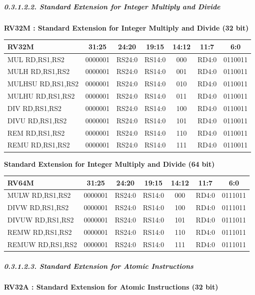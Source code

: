 \documentclass[
]{article}
\begin{document}
\hypertarget{standard-extension-for-integer-multiply-and-divide-1}{%
\subparagraph{0.3.1.2.2. Standard Extension for Integer Multiply and
Divide}\label{standard-extension-for-integer-multiply-and-divide-1}}

\textbf{RV32M : Standard Extension for Integer Multiply and Divide (32
bit)}

\begin{longtable}[]{@{}lcccccc@{}}
\toprule
RV32M & 31:25 & 24:20 & 19:15 & 14:12 & 11:7 & 6:0\tabularnewline
\midrule
\endhead
MUL RD,RS1,RS2 & 0000001 & RS24:0 & RS14:0 & 000 & RD4:0 &
0110011\tabularnewline
MULH RD,RS1,RS2 & 0000001 & RS24:0 & RS14:0 & 001 & RD4:0 &
0110011\tabularnewline
MULHSU RD,RS1,RS2 & 0000001 & RS24:0 & RS14:0 & 010 & RD4:0 &
0110011\tabularnewline
MULHU RD,RS1,RS2 & 0000001 & RS24:0 & RS14:0 & 011 & RD4:0 &
0110011\tabularnewline
DIV RD,RS1,RS2 & 0000001 & RS24:0 & RS14:0 & 100 & RD4:0 &
0110011\tabularnewline
DIVU RD,RS1,RS2 & 0000001 & RS24:0 & RS14:0 & 101 & RD4:0 &
0110011\tabularnewline
REM RD,RS1,RS2 & 0000001 & RS24:0 & RS14:0 & 110 & RD4:0 &
0110011\tabularnewline
REMU RD,RS1,RS2 & 0000001 & RS24:0 & RS14:0 & 111 & RD4:0 &
0110011\tabularnewline
\bottomrule
\end{longtable}

\textbf{Standard Extension for Integer Multiply and Divide (64 bit)}

\begin{longtable}[]{@{}lcccccc@{}}
\toprule
RV64M & 31:25 & 24:20 & 19:15 & 14:12 & 11:7 & 6:0\tabularnewline
\midrule
\endhead
MULW RD,RS1,RS2 & 0000001 & RS24:0 & RS14:0 & 000 & RD4:0 &
0111011\tabularnewline
DIVW RD,RS1,RS2 & 0000001 & RS24:0 & RS14:0 & 100 & RD4:0 &
0111011\tabularnewline
DIVUW RD,RS1,RS2 & 0000001 & RS24:0 & RS14:0 & 101 & RD4:0 &
0111011\tabularnewline
REMW RD,RS1,RS2 & 0000001 & RS24:0 & RS14:0 & 110 & RD4:0 &
0111011\tabularnewline
REMUW RD,RS1,RS2 & 0000001 & RS24:0 & RS14:0 & 111 & RD4:0 &
0111011\tabularnewline
\bottomrule
\end{longtable}

\hypertarget{standard-extension-for-atomic-instructions-1}{%
\subparagraph{0.3.1.2.3. Standard Extension for Atomic
Instructions}\label{standard-extension-for-atomic-instructions-1}}

\textbf{RV32A : Standard Extension for Atomic Instructions (32 bit)}
\end{document}
